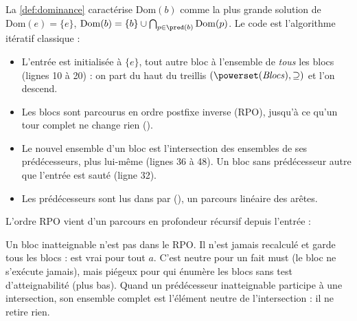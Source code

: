\subsection{}

La \cref{def:dominance} caractérise $\mathrm{Dom}(b)$ comme la plus grande
solution de $\mathrm{Dom}(e) = \{e\}$, $\mathrm{Dom}(b) = \{b\} \cup
\bigcap_{p \in \pred(b)} \mathrm{Dom}(p)$. Le code est l'algorithme itératif
classique :


\begin{itemize}
  \item L'entrée est initialisée à $\{e\}$, tout autre bloc à l'ensemble de
    \emph{tous} les blocs (lignes 10 à 20) : on part du haut du treillis
    $(\powerset(\mathit{Blocs}), \supseteq)$ et l'on descend.
  \item Les blocs sont parcourus en ordre postfixe inverse (RPO), jusqu'à ce
    qu'un tour complet ne change rien ().
  \item Le nouvel ensemble d'un bloc est l'intersection des ensembles de ses
    prédécesseurs, plus lui-même (lignes 36 à 48). Un bloc sans
    prédécesseur autre que l'entrée est sauté (ligne 32).
  \item Les prédécesseurs sont lus dans  par
     (), un parcours
    linéaire des arêtes.
\end{itemize}

L'ordre RPO vient d'un parcours en profondeur récursif depuis l'entrée :


Un bloc inatteignable n'est pas dans le RPO. Il n'est jamais recalculé et garde
\og tous les blocs\fg{} :  est vrai pour tout $a$. C'est
neutre pour un fait must (le bloc ne s'exécute jamais), mais piégeux pour qui
énumère les blocs sans test d'atteignabilité (plus bas). Quand un prédécesseur
inatteignable participe à une intersection, son ensemble complet est l'élément
neutre de l'intersection : il ne retire rien.

